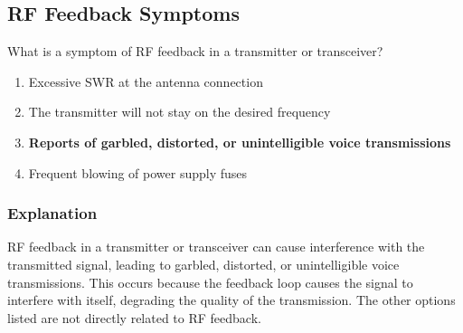 \subsection{RF Feedback Symptoms}
\label{T7B11}

\begin{tcolorbox}[colback=gray!10!white,colframe=black!75!black,title=T7B11]
What is a symptom of RF feedback in a transmitter or transceiver?
\begin{enumerate}[noitemsep]
    \item Excessive SWR at the antenna connection
    \item The transmitter will not stay on the desired frequency
    \item \textbf{Reports of garbled, distorted, or unintelligible voice transmissions}
    \item Frequent blowing of power supply fuses
\end{enumerate}
\end{tcolorbox}

\subsubsection*{Explanation}
RF feedback in a transmitter or transceiver can cause interference with the transmitted signal, leading to garbled, distorted, or unintelligible voice transmissions. This occurs because the feedback loop causes the signal to interfere with itself, degrading the quality of the transmission. The other options listed are not directly related to RF feedback.